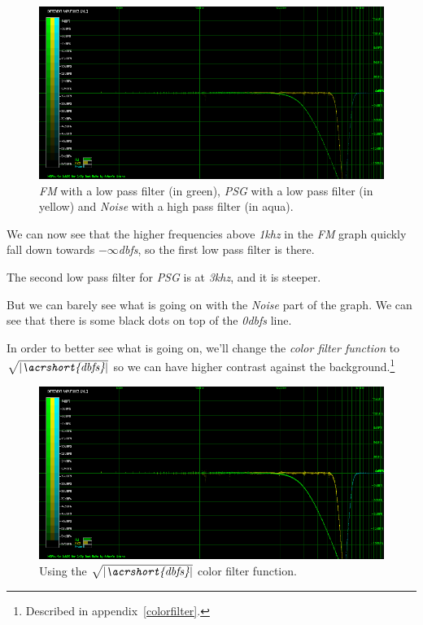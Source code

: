 \documentclass[10pt,a4paper]{report}
\newcommand{\ac}[1]{\textit{\mbox{\acrshort{#1}}}}
\newcommand{\khz}[1]{\textit{\mbox{#1\acrshort{khz}}}}
\newcommand{\db}[1]{\textit{\mbox{#1\acrshort{dbfs}}}}
\newcommand{\rootdb}{$\sqrt{|\ac{dbfs}|}$}
\begin{document}
\begin{figure}[H]
	\centering
	\includegraphics[width=1.0\linewidth]{images/interpretation/Plot4-1-All.png}
	\caption[All Plotted]{\textit{FM} with a low pass filter (in green), \textit{PSG} with a low pass filter (in yellow) and \textit{Noise} with a high pass filter (in aqua).}
	\label{fig:plot4-1-all}
\end{figure}

We can now see that the higher frequencies above \khz{1} in the \textit{FM} graph quickly fall down towards \db{$-\infty$}, so the first low pass filter is there.

The second low pass filter for \textit{PSG} is at \khz{3}, and it is steeper.

But we can barely see what is going on with the \textit{Noise} part of the graph. We can see that there is some black dots on top of the \db{0} line.

In order to better see what is going on, we'll change the \textit{color filter function} to \rootdb{} so we can have higher contrast against the background.\footnote{Described in appendix~\ref{colorfilter}.}

\begin{figure}[H]
	\centering
	\includegraphics[width=1.0\linewidth]{images/interpretation/Plot4-2-All-sqrt.png}
	\caption[Using SQRT]{Using the \rootdb{} color filter function.}
	\label{fig:plot4-2-all-sqrt}
\end{figure}
\end{document}
